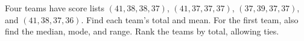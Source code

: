 Four teams have score lists $(41,38,38,37)$, $(41,37,37,37)$, $(37,39,37,37)$, and $(41,38,37,36)$. Find each team's total and mean. For the first team, also find the median, mode, and range. Rank the teams by total, allowing ties.
